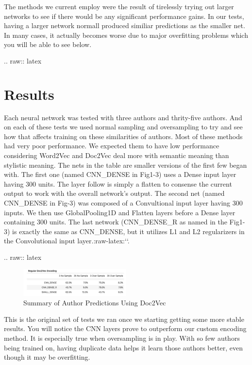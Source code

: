 \documentclass[conference]{IEEEtran}
\begin{document}
The methods we current employ were the result of tirelessly trying out larger networks to see if there would be any significant performance gains. In our tests, having a larger network normall produced similiar predictions as the smaller net. In many cases, it actually becomes worse due to major overfitting problems which you will be able to see below.

.. raw:: latex

   \section{Results}

Each neural network was tested with three authors and thrity-five
authors. And on each of these tests we used normal sampling and
oversampling to try and see how that affects training on these
similarities of authors. Most of these methods had very poor
performance. We expected them to have low performance considering
Word2Vec and Doc2Vec deal more with semantic meaning than stylistic
meaning. The nets in the table are smaller versions of the first few
began with. The first one (named CNN\_DENSE in Fig1-3) uses a Dense
input layer having 300 units. The layer follow is simply a flatten to
consense the current output to work with the overall network's output.
The second net (named CNN\_DENSE in Fig-3) was composed of a
Convultional input layer having 300 inputs. We then use GlobalPooling1D
and Flatten layers before a Dense layer containing 300 units. The last
network (CNN\_DENSE\_R as named in the Fig1-3) is exactly the same as
CNN\_DENSE, but it utilizes L1 and L2 regularizers in the Convolutional
input layer.:raw-latex:`\cite{b4}`.

.. raw:: latex

   \begin{figure}[h!]
     \centering
       \includegraphics[width=0.5\textwidth]{regular_Doc2Vec}
     \caption{Summary of Author Predictions Using Doc2Vec}
   \end{figure}

This is the original set of tests we ran once we starting getting some
more stable results. You will notice the CNN layers prove to outperform
our custom encoding method. It is especially true when oversampling is
in play. With so few authors being trained on, having duplicate data
helps it learn those authors better, even though it may be overfitting.
\end{document}
